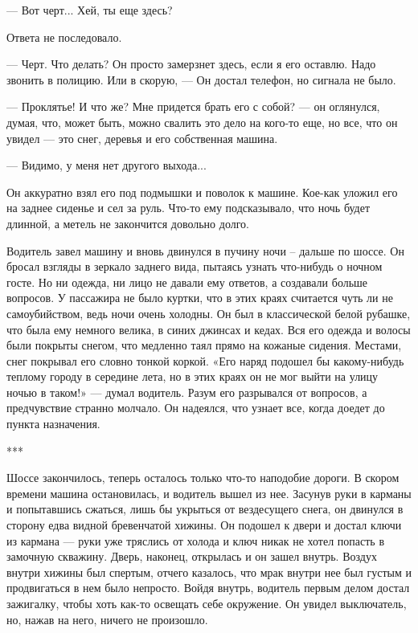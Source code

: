 — Вот черт... Хей, ты еще здесь?

Ответа не последовало.

— Черт. Что делать? Он просто замерзнет здесь, если я его оставлю. Надо звонить в полицию. Или в скорую, — Он достал телефон, но сигнала не было.

— Проклятье! И что же? Мне придется брать его с собой? — он оглянулся, думая, что, может быть, можно свалить это дело на кого-то еще, но все, что он увидел — это снег, деревья и его собственная машина.

— Видимо, у меня нет другого выхода...

Он аккуратно взял его под подмышки и поволок к машине. Кое-как уложил его на заднее сиденье и сел за руль. Что-то ему подсказывало, что ночь будет длинной, а метель не закончится довольно долго.

Водитель завел машину и вновь двинулся в пучину ночи – дальше по шоссе. Он бросал взгляды в зеркало заднего вида, пытаясь узнать что-нибудь о ночном госте. Но ни одежда, ни лицо не давали ему ответов, а создавали больше вопросов. У пассажира не было куртки, что в этих краях считается чуть ли не самоубийством, ведь ночи очень холодны. Он был в классической белой рубашке, что была ему немного велика, в синих джинсах и кедах. Вся его одежда и волосы были покрыты снегом, что медленно таял прямо на кожаные сидения. Местами, снег покрывал его словно тонкой коркой. «Его наряд подошел бы какому-нибудь теплому городу в середине лета, но в этих краях он не мог выйти на улицу ночью в таком!» — думал водитель. Разум его разрывался от вопросов, а предчувствие странно молчало. Он надеялся, что узнает все, когда доедет до пункта назначения.

\begin{center}***\end{center}

Шоссе закончилось, теперь осталось только что-то наподобие дороги. В скором времени машина остановилась, и водитель вышел из нее. Засунув руки в карманы и попытавшись сжаться, лишь бы укрыться от вездесущего снега, он двинулся в сторону едва видной бревенчатой хижины. Он подошел к двери и достал ключи из кармана — руки уже тряслись от холода и ключ никак не хотел попасть в замочную скважину. Дверь, наконец, открылась и он зашел внутрь.  Воздух внутри хижины был спертым, отчего казалось, что мрак внутри нее был густым и продвигаться в нем было непросто. Войдя внутрь, водитель первым делом достал зажигалку, чтобы хоть как-то освещать себе окружение. Он увидел выключатель, но, нажав на него, ничего не произошло.

